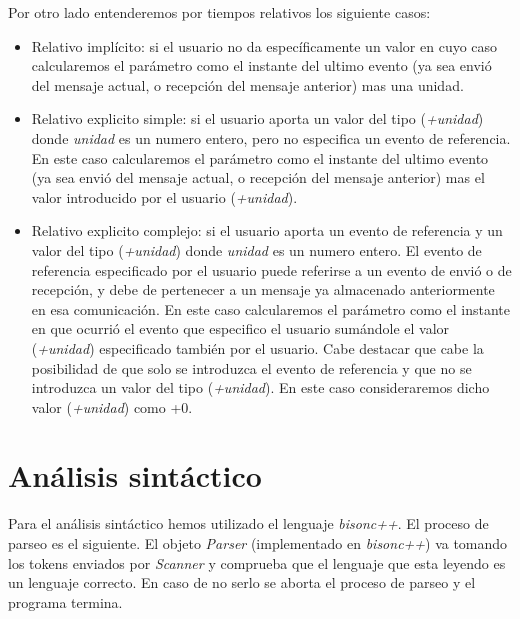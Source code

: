 \documentclass{article}
\begin{document}
Por otro lado entenderemos por tiempos relativos los siguiente casos:

\begin{itemize}
\item Relativo implícito: si el usuario no da específicamente un valor en cuyo caso calcularemos el parámetro como el instante del ultimo evento (ya sea envió del mensaje actual, o recepción del mensaje anterior) mas una unidad.
\item Relativo explicito simple: si el usuario aporta un valor del tipo (\textit{+unidad}) donde \textit{unidad} es un numero entero, pero no especifica un evento de referencia. En este caso calcularemos el parámetro como el instante del ultimo evento (ya sea envió del mensaje actual, o recepción del mensaje anterior) mas el valor introducido por el usuario (\textit{+unidad}).
\item Relativo explicito complejo: si el usuario aporta un evento de referencia y un valor del tipo (\textit{+unidad}) donde \textit{unidad} es un numero entero. El evento de referencia especificado por el usuario puede referirse a un evento de envió o de recepción, y debe de pertenecer a un mensaje ya almacenado anteriormente en esa comunicación. En este caso calcularemos el parámetro como el instante en que ocurrió el evento que especifico el usuario sumándole el valor (\textit{+unidad}) especificado también por el usuario. Cabe destacar que cabe la posibilidad de que solo se introduzca el evento de referencia y que no se introduzca un valor del tipo (\textit{+unidad}). En este caso consideraremos dicho valor (\textit{+unidad}) como +0.
\end{itemize}

\section{Análisis sintáctico}

Para el análisis sintáctico hemos utilizado el lenguaje \textit{bisonc++}. El proceso de parseo es el siguiente. El objeto \textit{Parser} (implementado en \textit{bisonc++}) va tomando los tokens enviados por \textit{Scanner} y comprueba que el lenguaje que esta leyendo es un lenguaje correcto. En caso de no serlo se aborta el proceso de parseo y el programa termina.
\end{document}
